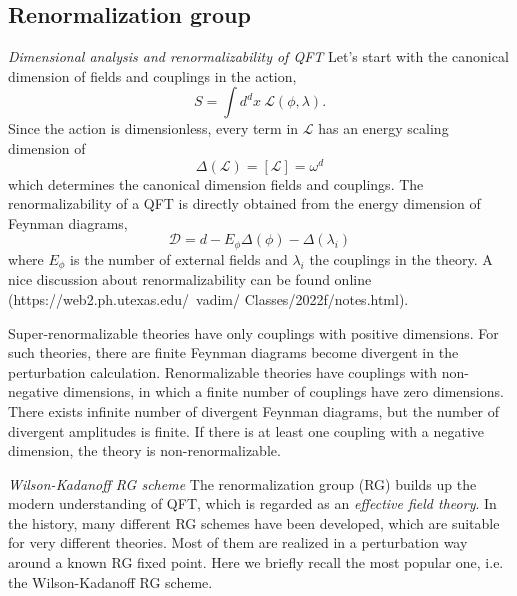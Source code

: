 \documentclass[submission, PhysLectNotes]{SciPost}
\begin{document}
\subsection{Renormalization group}
{\it Dimensional analysis and renormalizability of QFT}
Let's start with the canonical dimension of fields and couplings in the action,
\begin{equation}
    S = \int d^dx \ \mathcal{L}(\phi, \lambda).
\end{equation}
Since the action is dimensionless, every term in $\mathcal{L}$ has an energy scaling dimension of
\begin{equation}
    \Delta(\mathcal{L}) = [\mathcal{L}] = \omega^d
\end{equation}
which determines the canonical dimension fields and couplings. The renormalizability of a QFT is directly obtained from the energy dimension of Feynman diagrams,
\begin{equation}
    \mathcal{D} = d - E_{\phi} \Delta (\phi) - \Delta (\lambda_i)
\end{equation}
where $E_{\phi}$ is the number of external fields and $\lambda_i$ the couplings in the theory. A nice discussion about renormalizability can be found online (https://web2.ph.utexas.edu/~vadim/
Classes/2022f/notes.html).

Super-renormalizable theories have only couplings with positive dimensions. For such theories, there are finite Feynman diagrams become divergent in the perturbation calculation. Renormalizable theories have couplings with non-negative dimensions, in which a finite number of couplings have zero dimensions. There exists infinite number of divergent Feynman diagrams, but the number of divergent amplitudes is finite. If there is at least one coupling with a negative dimension, the theory is non-renormalizable.

{\it Wilson-Kadanoff RG scheme}
The renormalization group (RG) builds up the modern understanding of QFT, which is regarded as an {\it effective field theory}. In the history, many different RG schemes have been developed, which are suitable for very different theories. Most of them are realized in a perturbation way around a known RG fixed point. Here we briefly recall the most popular one, i.e. the Wilson-Kadanoff RG scheme. 
\end{document}
